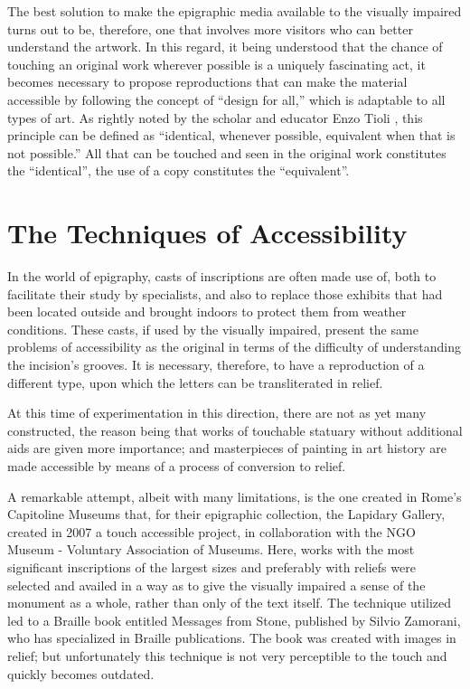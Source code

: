 \documentclass[amsthm,ebook]{saparticle}
\begin{document}
The best solution to make the epigraphic media available to the visually impaired turns out to be, therefore, one that
involves more visitors who can better understand the artwork. In this regard, it being understood that the chance of
touching an original work wherever possible is a uniquely fascinating act, it becomes necessary to propose
reproductions that can make the material accessible by following the concept of ``design for all,'' which is adaptable to
all types of art. As rightly noted by the scholar and educator Enzo Tioli \citep{Tioli2006},
this principle can be defined as ``identical, whenever possible, equivalent when that is not possible.'' All that can be
touched and seen in the original work constitutes the ``identical'', the use of a copy constitutes the ``equivalent''.







\section{The Techniques of Accessibility}
\noindent In the world of epigraphy, casts of inscriptions are often made use of, both to facilitate their study by specialists,
and also to replace those exhibits that had been located outside and brought indoors to protect them from weather
conditions. These casts, if used by the visually impaired, present the same problems of accessibility as the original
in terms of the difficulty of understanding the incision’s grooves. It is necessary, therefore, to have a reproduction
of a different type, upon which the letters can be transliterated in relief.

At this time of experimentation in this direction, there are not as yet many constructed, the reason being that works of
touchable statuary without additional aids are given more importance; and masterpieces of painting in art history are
made accessible by means of a process of conversion to relief.

A remarkable attempt, albeit with many limitations, is the one created in Rome’s Capitoline Museums that, for their
epigraphic collection, the Lapidary Gallery, created in 2007 a touch accessible project, in collaboration with the NGO
Museum - Voluntary Association of Museums. Here, works with the most significant inscriptions of the largest sizes and
preferably with reliefs were selected and availed in a way as to give the visually impaired a sense of the monument as
a whole, rather than only of the text itself. The technique utilized led to a Braille book entitled Messages from
Stone, published by Silvio Zamorani, who has specialized in Braille publications. The book was created with images in
relief; but unfortunately this technique is not very perceptible to the touch and quickly becomes outdated.
\end{document}
